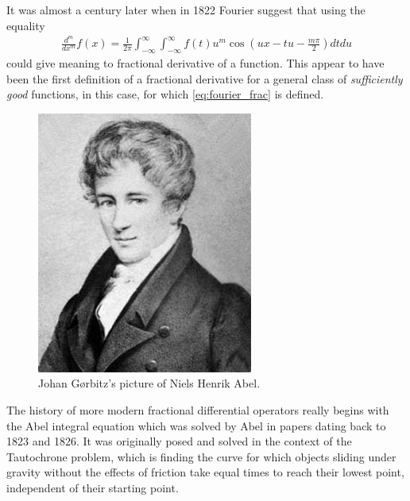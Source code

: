 It was almost a century later when in 1822 Fourier suggest that using the equality
\begin{align}
    \label{eq:fourier_frac}
    \frac{d^m}{dx^m} f(x) = \frac{1}{2\pi} \int_{-\infty}^\infty \int_{-\infty}^\infty f(t)u^m \cos\left(ux - tu - \frac{m\pi}{2}\right) dt du
\end{align}
could give meaning to fractional derivative of a function. This appear to have been the first definition of a fractional derivative for a general class of \emph{sufficiently good} functions, in this case, for which \eqref{eq:fourier_frac} is defined.

\begin{figure}
    \includegraphics[scale=0.5]{images/Niels_Henrik_Abel}
    \caption{Johan Gørbitz's picture of Niels Henrik Abel.}
\end{figure}

The history of more modern fractional differential operators really begins with the Abel integral equation which was solved by Abel in papers dating back to 1823 and 1826. It was originally posed and solved in the context of the Tautochrone problem, which is finding the curve for which objects sliding under gravity without the effects of friction take equal times to reach their lowest point, independent of their starting point.

